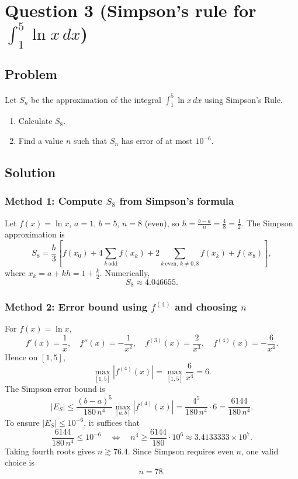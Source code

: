\documentclass[12pt]{article}
\begin{document}
\newpage


\section*{Question 3 (Simpson's rule for \(\int_1^5 \ln x\,dx\))}

\subsection*{Problem}
Let \(S_n\) be the approximation of the integral \(\displaystyle \int_{1}^{5}\ln x\,dx\) using Simpson's Rule.
\begin{enumerate}[label=(\roman*)]
\item Calculate \(S_8\).
\item Find a value \(n\) such that \(S_n\) has error of at most \(10^{-6}\).
\end{enumerate}

\subsection*{Solution}

\subsubsection*{Method 1: Compute \(S_8\) from Simpson's formula}

Let \(f(x)=\ln x\), \(a=1\), \(b=5\), \(n=8\) (even), so \(h=\frac{b-a}{n}=\frac{4}{8}=\frac{1}{2}\).
The Simpson approximation is
\[
S_{8}=\frac{h}{3}\left[f(x_0)+4\sum_{k\ \text{odd}} f(x_k)+2\sum_{k\ \text{even},\,k\neq 0,8} f(x_k)+f(x_8)\right],
\]
where \(x_k=a+kh=1+\frac{k}{2}\). Numerically,
\[
\boxed{S_{8}\approx 4.046655.}
\]

\subsubsection*{Method 2: Error bound using \(f^{(4)}\) and choosing \(n\)}

For \(f(x)=\ln x\),
\[
f'(x)=\frac{1}{x},\quad
f''(x)=-\frac{1}{x^{2}},\quad
f^{(3)}(x)=\frac{2}{x^{3}},\quad
f^{(4)}(x)=-\frac{6}{x^{4}}.
\]
Hence on \([1,5]\),
\[
\max_{[1,5]}|f^{(4)}(x)|=\max_{[1,5]}\frac{6}{x^{4}}=6.
\]
The Simpson error bound is
\[
|E_S|\le \frac{(b-a)^{5}}{180\,n^{4}}\max_{[a,b]}|f^{(4)}(x)|
= \frac{4^{5}}{180\,n^{4}}\cdot 6
=\frac{6144}{180\,n^{4}}.
\]
To ensure \(|E_S|\le 10^{-6}\), it suffices that
\[
\frac{6144}{180\,n^{4}}\le 10^{-6}
\quad\Longleftrightarrow\quad
n^{4}\ge \frac{6144}{180}\cdot 10^{6}\approx 3.4133333\times 10^{7}.
\]
Taking fourth roots gives \(n\gtrsim 76.4\). Since Simpson requires even \(n\), one valid choice is
\[
\boxed{n=78.}
\]
\end{document}
